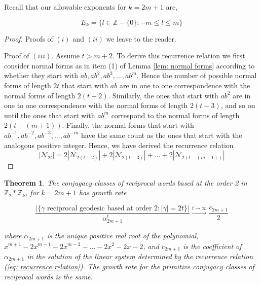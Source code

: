\documentclass[11pt]{amsart}
\numberwithin{equation}{section}
\theoremstyle{plain}
\newtheorem{thm}{Theorem}[section]
\begin{document}
Recall that our allowable exponents for $k=2m+1$ are,


\begin{displaymath}
E_k=\{l \in \mathbb{Z}-\{0\} : -m \leq l \leq m \}
\end{displaymath}
  
  
  \begin{proof} Proofs of $(i)$ and $(ii)$  we leave to the reader. 
  	
  	Proof of $(iii)$.  Assume $t > m+2$. To derive this  recurrence relation we first  consider normal forms as in 
	item (1) of Lemma \ref{lem: normal forms}  according to whether they start with 
$ab , ab^{2} , ab^{3}, ..., ab^{m}$. Hence the number of possible normal forms of length $2t$  that start with $ab$ are in one to one correspondence with the normal forms of length $2(t-2)$.
Similarly, the ones that start with $ab^{2}$ are in one to one correspondence with the normal forms of length $2(t-3)$, and so on
until the ones that start with $ab^{m}$ correspond to the normal forms of 
length $2(t-(m+1))$.  Finally, the normal forms that start with 
$ab^{-1} , ab^{-2} , ab^{-3}, ..., ab^{-m}$ have the same  count as the ones that start with the analogous positive integer. Hence,  we have derived the recurrence  relation
$$
|\mathcal{N}_{2t}| = 2|\mathcal{N}_{2(t-2)}| + 2|\mathcal{N}_{2(t-3)}| + \dots + 2|\mathcal{N}_{2(t-(m+1))}|
$$  	
  \end{proof}
  
  
  
  \begin{thm}\label{thm:binetz2zkoddforrecursion}
   The conjugacy classes of reciprocal words based at the order 2  in 
   $\mathbb{Z}_{2} * \mathbb{Z}_{k}$,  for  $k=2m+1$ has growth rate

\begin{displaymath}
\frac{\big|\{\gamma \text{ reciprocal geodesic based at order 2}: |\gamma|=2t\}\big|}
{\alpha_{2m+1}^{t}} \xrightarrow{t\to\infty} \frac{c_{2m+1}}{2}
\end{displaymath}


   where  $\alpha_{2m+1}$  is the unique positive real root of the polynomial, $x^{m+1} -2x^{m-1} -2x^{m-2} - \dots -2x^{2} -2x-2$, and $c_{2m+1}$ 	is the coefficient of $\alpha_{2m+1}$ in the solution of the linear system determined by the recurrence relation (\ref{eq: recurrence relation}).
   The growth rate for the primitive conjugacy classes  of reciprocal words 
   is the same. 
  \end{thm}
  
\end{document}
